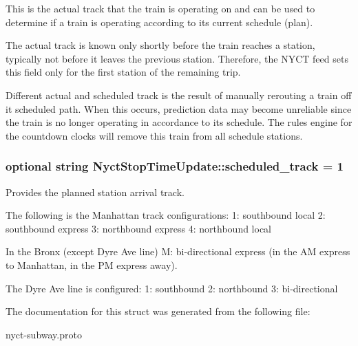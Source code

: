 This is the actual track that the train is operating on and can be used to determine if a train is operating according to its current schedule (plan). 

The actual track is known only shortly before the train reaches a station, typically not before it leaves the previous station. Therefore, the N\+Y\+CT feed sets this field only for the first station of the remaining trip.

Different actual and scheduled track is the result of manually rerouting a train off it scheduled path. When this occurs, prediction data may become unreliable since the train is no longer operating in accordance to its schedule. The rules engine for the \textquotesingle{}countdown\textquotesingle{} clocks will remove this train from all schedule stations. 
\subsubsection[{\texorpdfstring{scheduled\+\_\+track}{scheduled_track}}]{\setlength{\rightskip}{0pt plus 5cm}optional string Nyct\+Stop\+Time\+Update\+::scheduled\+\_\+track = 1}\hypertarget{structNyctStopTimeUpdate_a07cd8f81941772b2b04bc848ac8c971b}{}\label{structNyctStopTimeUpdate_a07cd8f81941772b2b04bc848ac8c971b}


Provides the planned station arrival track. 

The following is the Manhattan track configurations\+: 1\+: southbound local 2\+: southbound express 3\+: northbound express 4\+: northbound local

In the Bronx (except Dyre Ave line) M\+: bi-\/directional express (in the AM express to Manhattan, in the PM express away).

The Dyre Ave line is configured\+: 1\+: southbound 2\+: northbound 3\+: bi-\/directional 

The documentation for this struct was generated from the following file\+:\begin{DoxyCompactItemize}
\item 
nyct-\/subway.\+proto\end{DoxyCompactItemize}

